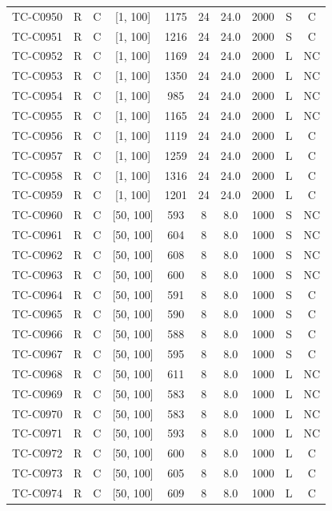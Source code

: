 \begin{longtable}{lccccccccc}
TC-C0950 & R & C & [1, 100] & 1175 & 24 & 24.0 & 2000 & S & C \\
TC-C0951 & R & C & [1, 100] & 1216 & 24 & 24.0 & 2000 & S & C \\
TC-C0952 & R & C & [1, 100] & 1169 & 24 & 24.0 & 2000 & L & NC \\
TC-C0953 & R & C & [1, 100] & 1350 & 24 & 24.0 & 2000 & L & NC \\
TC-C0954 & R & C & [1, 100] & 985 & 24 & 24.0 & 2000 & L & NC \\
TC-C0955 & R & C & [1, 100] & 1165 & 24 & 24.0 & 2000 & L & NC \\
TC-C0956 & R & C & [1, 100] & 1119 & 24 & 24.0 & 2000 & L & C \\
TC-C0957 & R & C & [1, 100] & 1259 & 24 & 24.0 & 2000 & L & C \\
TC-C0958 & R & C & [1, 100] & 1316 & 24 & 24.0 & 2000 & L & C \\
TC-C0959 & R & C & [1, 100] & 1201 & 24 & 24.0 & 2000 & L & C \\
TC-C0960 & R & C & [50, 100] & 593 & 8 & 8.0 & 1000 & S & NC \\
TC-C0961 & R & C & [50, 100] & 604 & 8 & 8.0 & 1000 & S & NC \\
TC-C0962 & R & C & [50, 100] & 608 & 8 & 8.0 & 1000 & S & NC \\
TC-C0963 & R & C & [50, 100] & 600 & 8 & 8.0 & 1000 & S & NC \\
TC-C0964 & R & C & [50, 100] & 591 & 8 & 8.0 & 1000 & S & C \\
TC-C0965 & R & C & [50, 100] & 590 & 8 & 8.0 & 1000 & S & C \\
TC-C0966 & R & C & [50, 100] & 588 & 8 & 8.0 & 1000 & S & C \\
TC-C0967 & R & C & [50, 100] & 595 & 8 & 8.0 & 1000 & S & C \\
TC-C0968 & R & C & [50, 100] & 611 & 8 & 8.0 & 1000 & L & NC \\
TC-C0969 & R & C & [50, 100] & 583 & 8 & 8.0 & 1000 & L & NC \\
TC-C0970 & R & C & [50, 100] & 583 & 8 & 8.0 & 1000 & L & NC \\
TC-C0971 & R & C & [50, 100] & 593 & 8 & 8.0 & 1000 & L & NC \\
TC-C0972 & R & C & [50, 100] & 600 & 8 & 8.0 & 1000 & L & C \\
TC-C0973 & R & C & [50, 100] & 605 & 8 & 8.0 & 1000 & L & C \\
TC-C0974 & R & C & [50, 100] & 609 & 8 & 8.0 & 1000 & L & C \\

\end{longtable}
